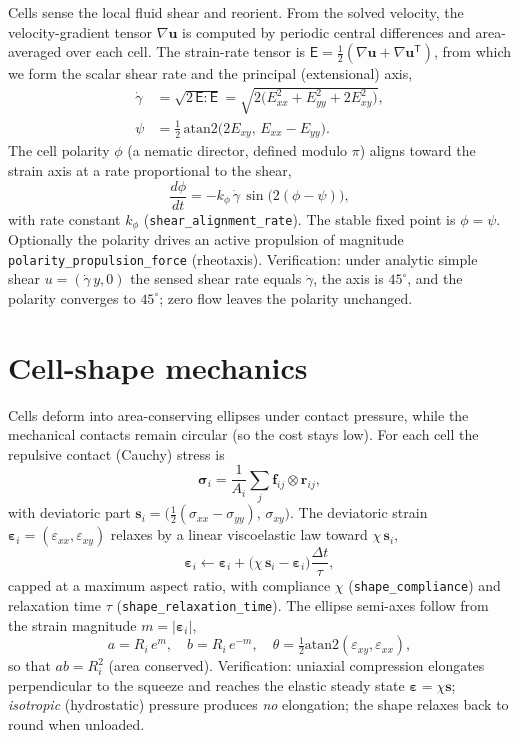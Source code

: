 \documentclass[11pt]{article}
\newcommand{\vu}{\bm{u}}
\newcommand{\vf}{\bm{f}}
\newcommand{\vr}{\bm{r}}
\newcommand{\grad}{\nabla}
\newcommand{\dt}{\Delta t}
\begin{document}
Cells sense the local fluid shear and reorient. From the solved velocity, the
velocity-gradient tensor $\grad\vu$ is computed by periodic central differences
and area-averaged over each cell. The strain-rate tensor is
$\mathsf{E} = \tfrac{1}{2}(\grad\vu + \grad\vu^{\mathsf{T}})$, from which we
form the scalar shear rate and the principal (extensional) axis,
\begin{align}
  \dot\gamma &= \sqrt{2\,\mathsf{E}\!:\!\mathsf{E}}
  = \sqrt{2\big(E_{xx}^2+E_{yy}^2+2E_{xy}^2\big)}, \\
  \psi &= \tfrac{1}{2}\,\mathrm{atan2}\big(2E_{xy},\, E_{xx}-E_{yy}\big).
\end{align}
The cell polarity $\phi$ (a nematic director, defined modulo $\pi$) aligns toward
the strain axis at a rate proportional to the shear,
\begin{equation}
  \frac{d\phi}{dt} = -k_\phi\,\dot\gamma\,\sin\!\big(2(\phi-\psi)\big),
\end{equation}
with rate constant $k_\phi$ (\texttt{shear\_alignment\_rate}). The stable fixed
point is $\phi=\psi$. Optionally the polarity drives an active propulsion of
magnitude \texttt{polarity\_propulsion\_force} (rheotaxis). Verification: under
analytic simple shear $u=(\dot\gamma\,y,0)$ the sensed shear rate equals
$\dot\gamma$, the axis is $45^\circ$, and the polarity converges to $45^\circ$;
zero flow leaves the polarity unchanged.

\section{Cell-shape mechanics}\label{sec:shape}

Cells deform into area-conserving ellipses under contact pressure, while the
mechanical contacts remain circular (so the cost stays low). For each cell the
repulsive contact (Cauchy) stress is
\begin{equation}
  \bm{\sigma}_i = \frac{1}{A_i}\sum_j \vf_{ij}\otimes\vr_{ij},
\end{equation}
with deviatoric part
$\bm{s}_i = \big(\tfrac{1}{2}(\sigma_{xx}-\sigma_{yy}),\, \sigma_{xy}\big)$. The
deviatoric strain $\bm{\varepsilon}_i=(\varepsilon_{xx},\varepsilon_{xy})$
relaxes by a linear viscoelastic law toward $\chi\,\bm{s}_i$,
\begin{equation}
  \bm{\varepsilon}_i \leftarrow \bm{\varepsilon}_i
  + \big(\chi\,\bm{s}_i - \bm{\varepsilon}_i\big)\frac{\dt}{\tau},
\end{equation}
capped at a maximum aspect ratio, with compliance $\chi$
(\texttt{shape\_compliance}) and relaxation time $\tau$
(\texttt{shape\_relaxation\_time}). The ellipse semi-axes follow from the strain
magnitude $m=\lvert\bm{\varepsilon}_i\rvert$,
\begin{equation}
  a = R_i\,e^{m}, \quad b = R_i\,e^{-m}, \quad
  \theta = \tfrac{1}{2}\mathrm{atan2}(\varepsilon_{xy},\varepsilon_{xx}),
\end{equation}
so that $ab=R_i^2$ (area conserved). Verification: uniaxial compression
elongates perpendicular to the squeeze and reaches the elastic steady state
$\bm{\varepsilon}=\chi\bm{s}$; \emph{isotropic} (hydrostatic) pressure produces
\emph{no} elongation; the shape relaxes back to round when unloaded.
\end{document}
